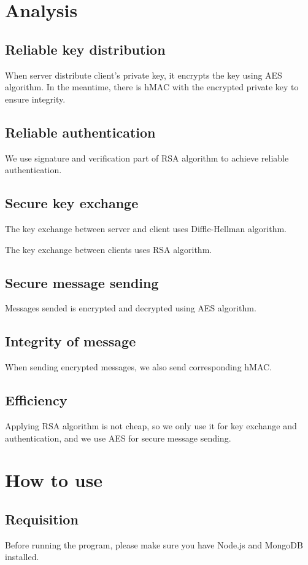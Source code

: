 \documentclass[11pt]{article}
\begin{document}
\section{Analysis}
\subsection{Reliable key distribution}
When server distribute client's private key, it encrypts the key using AES algorithm. In the meantime, there is hMAC with the encrypted private key to ensure integrity.

\subsection{Reliable authentication}
We use signature and verification part of RSA algorithm to achieve reliable authentication.

\subsection{Secure key exchange}
The key exchange between server and client uses Diffle-Hellman algorithm.

The key exchange between clients uses RSA algorithm.

\subsection{Secure message sending}
Messages sended is encrypted and decrypted using AES algorithm.

\subsection{Integrity of message}
When sending encrypted messages, we also send corresponding hMAC.

\subsection{Efficiency}
Applying RSA algorithm is not cheap, so we only use it for key exchange and authentication, and we use AES for secure message sending.


\section{How to use}
\subsection{Requisition}
Before running the program, please make sure you have Node.js and MongoDB installed.
\end{document}
